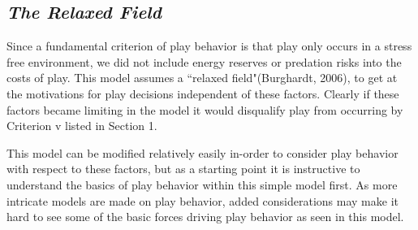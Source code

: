 \documentclass[12pt, letterpaper, fleqn]{article}
\begin{document}
  \subsection*{\it The Relaxed Field}
    Since a fundamental criterion of play behavior is that play only occurs in a stress free environment, we did not include energy reserves or predation risks into the costs of play. 
    This model assumes a ``relaxed field"(Burghardt, 2006), to get at the motivations for play decisions independent of these factors.
    Clearly if these factors became limiting in the model it would disqualify play from occurring by Criterion v listed in Section 1.

    This model can be modified relatively easily in-order to consider play behavior with respect to these factors, but as a starting point it is instructive to understand the basics of play behavior within this simple model first.
    As more intricate models are made on play behavior, added considerations may make it hard to see some of the basic forces driving play behavior as seen in this model.
\end{document}
